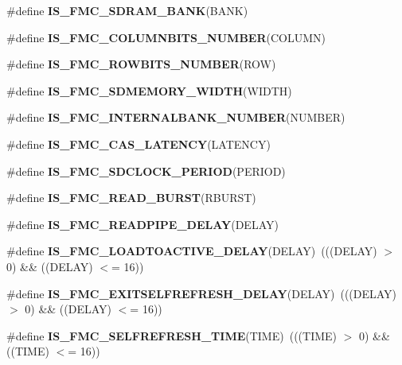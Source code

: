 \begin{DoxyCompactItemize}
\item 
\#define {\bfseries I\+S\+\_\+\+F\+M\+C\+\_\+\+S\+D\+R\+A\+M\+\_\+\+B\+A\+NK}(B\+A\+NK)
\item 
\#define {\bfseries I\+S\+\_\+\+F\+M\+C\+\_\+\+C\+O\+L\+U\+M\+N\+B\+I\+T\+S\+\_\+\+N\+U\+M\+B\+ER}(C\+O\+L\+U\+MN)
\item 
\#define {\bfseries I\+S\+\_\+\+F\+M\+C\+\_\+\+R\+O\+W\+B\+I\+T\+S\+\_\+\+N\+U\+M\+B\+ER}(R\+OW)
\item 
\#define {\bfseries I\+S\+\_\+\+F\+M\+C\+\_\+\+S\+D\+M\+E\+M\+O\+R\+Y\+\_\+\+W\+I\+D\+TH}(W\+I\+D\+TH)
\item 
\#define {\bfseries I\+S\+\_\+\+F\+M\+C\+\_\+\+I\+N\+T\+E\+R\+N\+A\+L\+B\+A\+N\+K\+\_\+\+N\+U\+M\+B\+ER}(N\+U\+M\+B\+ER)
\item 
\#define {\bfseries I\+S\+\_\+\+F\+M\+C\+\_\+\+C\+A\+S\+\_\+\+L\+A\+T\+E\+N\+CY}(L\+A\+T\+E\+N\+CY)
\item 
\#define {\bfseries I\+S\+\_\+\+F\+M\+C\+\_\+\+S\+D\+C\+L\+O\+C\+K\+\_\+\+P\+E\+R\+I\+OD}(P\+E\+R\+I\+OD)
\item 
\#define {\bfseries I\+S\+\_\+\+F\+M\+C\+\_\+\+R\+E\+A\+D\+\_\+\+B\+U\+R\+ST}(R\+B\+U\+R\+ST)
\item 
\#define {\bfseries I\+S\+\_\+\+F\+M\+C\+\_\+\+R\+E\+A\+D\+P\+I\+P\+E\+\_\+\+D\+E\+L\+AY}(D\+E\+L\+AY)
\item 
\#define {\bfseries I\+S\+\_\+\+F\+M\+C\+\_\+\+L\+O\+A\+D\+T\+O\+A\+C\+T\+I\+V\+E\+\_\+\+D\+E\+L\+AY}(D\+E\+L\+AY)~(((D\+E\+L\+AY) $>$ 0) \&\& ((D\+E\+L\+AY) $<$= 16))\hypertarget{group___f_s_m_c___l_l___assert___macros_gaeb3384ec9e4bceb4914417d83bea3e2a}{}\label{group___f_s_m_c___l_l___assert___macros_gaeb3384ec9e4bceb4914417d83bea3e2a}

\item 
\#define {\bfseries I\+S\+\_\+\+F\+M\+C\+\_\+\+E\+X\+I\+T\+S\+E\+L\+F\+R\+E\+F\+R\+E\+S\+H\+\_\+\+D\+E\+L\+AY}(D\+E\+L\+AY)~(((D\+E\+L\+AY) $>$ 0) \&\& ((D\+E\+L\+AY) $<$= 16))\hypertarget{group___f_s_m_c___l_l___assert___macros_gabd63be41b834225be30ba0b28ee6330b}{}\label{group___f_s_m_c___l_l___assert___macros_gabd63be41b834225be30ba0b28ee6330b}

\item 
\#define {\bfseries I\+S\+\_\+\+F\+M\+C\+\_\+\+S\+E\+L\+F\+R\+E\+F\+R\+E\+S\+H\+\_\+\+T\+I\+ME}(T\+I\+ME)~(((T\+I\+ME) $>$ 0) \&\& ((T\+I\+ME) $<$= 16))\hypertarget{group___f_s_m_c___l_l___assert___macros_ga0b7cd3a76d4c2b4811ddec857f4da0ab}{}\label{group___f_s_m_c___l_l___assert___macros_ga0b7cd3a76d4c2b4811ddec857f4da0ab}


\end{DoxyCompactItemize}

